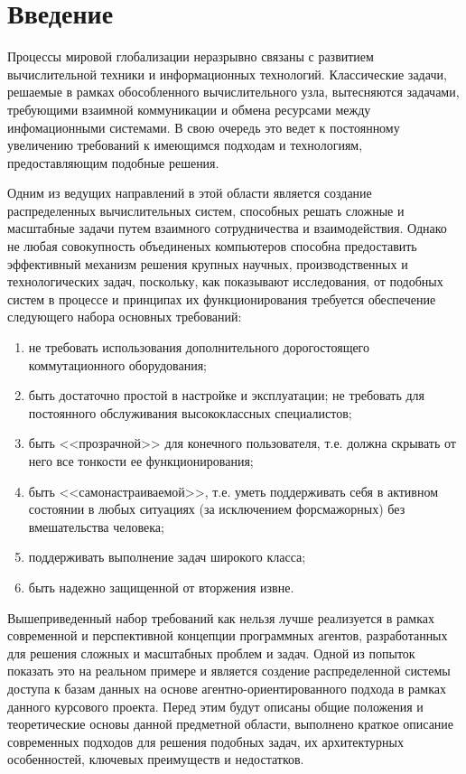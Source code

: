 \updateStamp
{}
\section*{Введение}
Процессы мировой глобализации неразрывно связаны с развитием вычислительной техники и информационных технологий. Классические задачи, решаемые в рамках обособленного вычислительного узла, вытесняются задачами, требующими взаимной коммуникации и обмена ресурсами между инфомационными системами. В свою очередь это ведет к постоянному увеличению требований к имеющимся подходам и технологиям, предоставляющим подобные решения.

Одним из ведущих направлений в этой области является создание распределенных вычислительных систем, способных решать сложные и масштабные задачи путем взаимного сотрудничества и взаимодействия. Однако не любая совокупность объединеных компьютеров способна предоставить эффективный механизм решения крупных научных, производственных и технологических задач, поскольку, как показывают исследования, от подобных систем в процессе и принципах их функционирования требуется обеспечение следующего набора основных требований:

\begin{enumerate}
\item не требовать использования дополнительного дорогостоящего коммутационного оборудования;
\item быть достаточно простой в настройке и эксплуатации; не требовать для постоянного обслуживания высококлассных специалистов;
\item быть <<прозрачной>> для конечного пользователя, т.е. должна скрывать от него все тонкости ее функционирования;
\item быть <<самонастраиваемой>>, т.е. уметь поддерживать себя в активном состоянии в любых ситуациях (за исключением форсмажорных) без вмешательства человека;
\item поддерживать выполнение задач широкого класса;
\item быть надежно защищенной от вторжения извне.
\end{enumerate}

Вышеприведенный набор требований как нельзя лучше реализуется в рамках современной и перспективной концепции программных агентов, разработанных для решения сложных и масштабных проблем и задач. Одной из попыток показать это на реальном примере и является создение распределенной системы доступа к базам данных на основе агентно-ориентированного подхода в рамках данного курсового проекта. Перед этим будут описаны общие положения и теоретические основы данной предметной области, выполнено краткое описание современных подходов для решения подобных задач, их архитектурных особенностей, ключевых преимуществ и недостатков.


